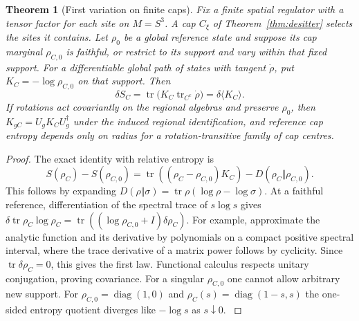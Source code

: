 \documentclass[aps,pra,onecolumn,superscriptaddress,nofootinbib,10pt]{revtex4-2}
\newtheorem{theorem}{Theorem}
\theoremstyle{definition}
\theoremstyle{remark}
\begin{document}
\begin{theorem}[First variation on finite caps]\label{ub:caplaw}
Fix a finite spatial regulator with a tensor factor for each site on
$M=S^3$. A cap $C_\xi$ of Theorem~\ref{thm:desitter} selects the sites
it contains. Let $\rho_0$ be a global reference state and suppose its
cap marginal $\rho_{C,0}$ is faithful, or restrict to its support and
vary within that fixed support. For a differentiable global path of
states with tangent $\dot\rho$, put $K_C=-\log\rho_{C,0}$ on that
support. Then
\[
 \delta S_C=\operatorname{tr}\bigl(K_C\operatorname{tr}_{C^c}\dot\rho\bigr)
             =\delta\langle K_C\rangle .
\]
If rotations act covariantly on the regional algebras and preserve
$\rho_0$, then $K_{gC}=U_g K_C U_g^\dagger$ under the induced
regional identification, and reference cap entropy depends only on radius
for a rotation-transitive family of cap centres.
\end{theorem}
\begin{proof}
The exact identity with relative entropy is
\[
 S(\rho_C)-S(\rho_{C,0})
  =\operatorname{tr}((\rho_C-\rho_{C,0})K_C)
       -D(\rho_C\Vert\rho_{C,0}).
\]
This follows by expanding $D(\rho\Vert\sigma)
=\operatorname{tr}\rho(\log\rho-\log\sigma)$.
At a faithful reference, differentiation of the spectral trace of
$s\log s$ gives
$\delta\operatorname{tr}\rho_C\log\rho_C
=\operatorname{tr}((\log\rho_{C,0}+I)\delta\rho_C)$.
For example, approximate the analytic function and its derivative
by polynomials on a compact positive spectral interval, where the trace
derivative of a matrix power follows by cyclicity.
Since $\operatorname{tr}\delta\rho_C=0$, this gives the first law.
Functional calculus respects unitary conjugation, proving covariance.
For a singular $\rho_{C,0}$ one cannot allow arbitrary new
support. For $\rho_{C,0}=\operatorname{diag}(1,0)$ and
$\rho_C(s)=\operatorname{diag}(1-s,s)$ the one-sided entropy quotient
diverges like $-\log s$ as $s\downarrow0$.
\cite{n1-blanco}
\end{proof}
\end{document}
